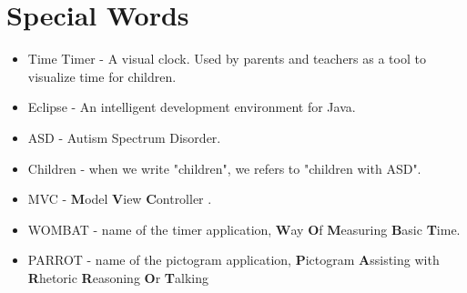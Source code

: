 \chapter*{Special Words}

\begin{itemize}

	\item Time Timer - A visual clock. Used by parents and teachers as a tool to visualize time for children.
	\item Eclipse - An intelligent development environment for Java.
	\item ASD - Autism Spectrum Disorder.
	\item Children - when we write "children", we refers to "children with ASD".
	\item MVC - \textbf{M}odel \textbf{V}iew \textbf{C}ontroller \cite{MVC}.
	\item WOMBAT - name of the timer application, \textbf{W}ay \textbf{O}f \textbf{M}easuring \textbf{B}asic \textbf{T}ime.
	\item PARROT - name of the pictogram application, \textbf{P}ictogram \textbf{A}ssisting with \textbf{R}hetoric \textbf{R}easoning \textbf{O}r \textbf{T}alking

\end{itemize}